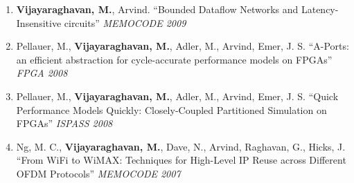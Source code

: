 \documentclass[margin,line]{resume}
\begin{document}
\begin{resume}
\begin{enumerate}
    \item \textbf{Vijayaraghavan, M.}, Arvind. ``Bounded Dataflow Networks and
    Latency-Insensitive circuits'' \textit{MEMOCODE 2009}
    \item Pellauer, M.,
    \textbf{Vijayaraghavan, M.}, Adler, M., Arvind, Emer, J. S. ``A-Ports: an
    efficient abstraction for cycle-accurate performance models on FPGAs''
    \textit{FPGA 2008}
    \item Pellauer, M., \textbf{Vijayaraghavan, M.}, Adler, M., Arvind, Emer,
    J. S. ``Quick Performance Models Quickly: Closely-Coupled Partitioned
    Simulation on FPGAs'' \textit{ISPASS 2008}
    \item Ng, M. C., \textbf{Vijayaraghavan, M.}, Dave, N., Arvind, Raghavan, G., Hicks, J. ``From WiFi to WiMAX: Techniques for High-Level IP Reuse across Different OFDM Protocols'' \textit{MEMOCODE 2007}
    \end{enumerate}





\end{resume}
\end{document}
